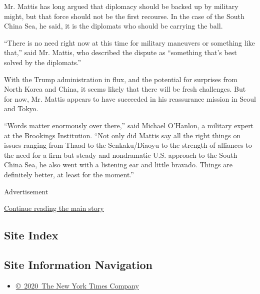 Mr. Mattis has long argued that diplomacy should be backed up by
military might, but that force should not be the first recourse. In the
case of the South China Sea, he said, it is the diplomats who should be
carrying the ball.

``There is no need right now at this time for military maneuvers or
something like that,'' said Mr. Mattis, who described the dispute as
``something that's best solved by the diplomats.''

With the Trump administration in flux, and the potential for surprises
from North Korea and China, it seems likely that there will be fresh
challenges. But for now, Mr. Mattis appears to have succeeded in his
reassurance mission in Seoul and Tokyo.

``Words matter enormously over there,'' said Michael O'Hanlon, a
military expert at the Brookings Institution. ``Not only did Mattis say
all the right things on issues ranging from Thaad to the Senkaku/Diaoyu
to the strength of alliances to the need for a firm but steady and
nondramatic U.S. approach to the South China Sea, he also went with a
listening ear and little bravado. Things are definitely better, at least
for the moment.''

Advertisement

\protect\hyperlink{after-bottom}{Continue reading the main story}

\hypertarget{site-index}{%
\subsection{Site Index}\label{site-index}}

\hypertarget{site-information-navigation}{%
\subsection{Site Information
Navigation}\label{site-information-navigation}}

\begin{itemize}
\tightlist
\item
  \href{https://help.nytimes.com/hc/en-us/articles/115014792127-Copyright-notice}{©~2020~The
  New York Times Company}
\end{itemize}

